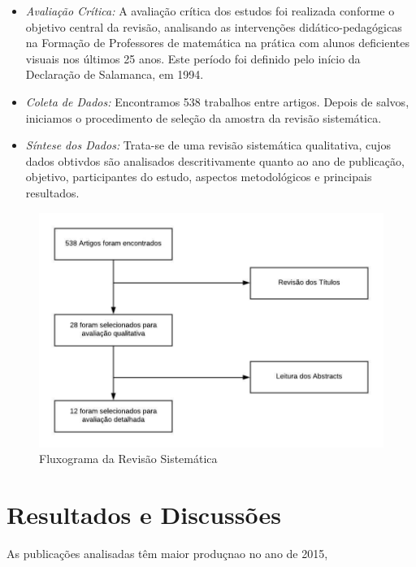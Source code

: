 \documentclass[12pt]{article}
\begin{document}
\begin{itemize}
    \item \textit{Avaliação Crítica:} A avaliação crítica dos estudos foi realizada conforme o objetivo central da revisão, analisando as intervenções didático-pedagógicas na Formação de Professores de matemática na prática com alunos deficientes visuais nos últimos 25 anos. Este período foi definido pelo início da Declaração de Salamanca, em 1994. 
    \item \textit{Coleta de Dados:} Encontramos 538 trabalhos entre artigos. Depois de salvos, iniciamos o procedimento de seleção da amostra da revisão sistemática. 
    \item \textit{Síntese dos Dados:} Trata-se de uma revisão sistemática qualitativa, cujos dados obtivdos são analisados descritivamente quanto ao ano de publicação, objetivo, participantes do estudo, aspectos metodológicos e principais resultados.
\end{itemize}

\begin{figure}[ht]
    \centering
    \includegraphics[width = .8\textwidth]{Pictures/revisao_sistematica.jpeg}
    \caption{Fluxograma da Revisão Sistemática}
    \label{fig:revisao_sistematica_fluxograma}
\end{figure}

\section{Resultados e Discussões}
As publicações analisadas têm maior produçnao no ano de 2015, 




\end{document}
